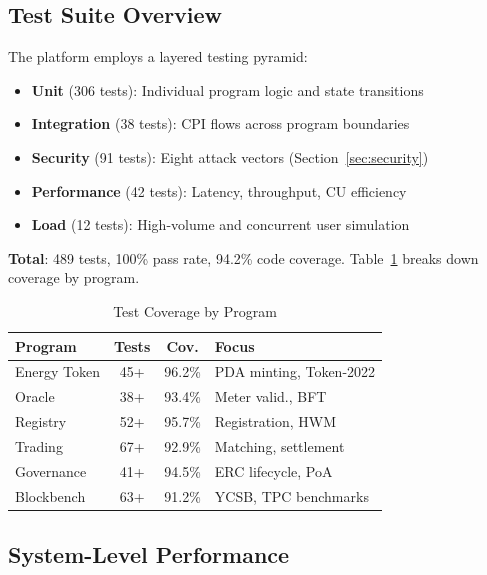 \documentclass[conference]{IEEEtran}
\begin{document}
\subsection{Test Suite Overview}

The platform employs a layered testing pyramid:

\begin{itemize}
    \item \textbf{Unit} (306 tests): Individual program logic and state transitions
    \item \textbf{Integration} (38 tests): CPI flows across program boundaries
    \item \textbf{Security} (91 tests): Eight attack vectors (Section~\ref{sec:security})
    \item \textbf{Performance} (42 tests): Latency, throughput, CU efficiency
    \item \textbf{Load} (12 tests): High-volume and concurrent user simulation
\end{itemize}

\textbf{Total}: 489 tests, 100\% pass rate, 94.2\% code coverage. Table~\ref{tab:test-coverage} breaks down coverage by program.

\begin{table}[htbp]
\caption{Test Coverage by Program}
\begin{center}
\small
\begin{tabular}{@{}lccp{2.8cm}@{}}
\toprule
\textbf{Program} & \textbf{Tests} & \textbf{Cov.} & \textbf{Focus} \\
\midrule
Energy Token & 45+ & 96.2\% & PDA minting, Token-2022 \\
Oracle & 38+ & 93.4\% & Meter valid., BFT \\
Registry & 52+ & 95.7\% & Registration, HWM \\
Trading & 67+ & 92.9\% & Matching, settlement \\
Governance & 41+ & 94.5\% & ERC lifecycle, PoA \\
Blockbench & 63+ & 91.2\% & YCSB, TPC benchmarks \\
\bottomrule
\end{tabular}
\label{tab:test-coverage}
\end{center}
\end{table}

\subsection{System-Level Performance}
\end{document}

